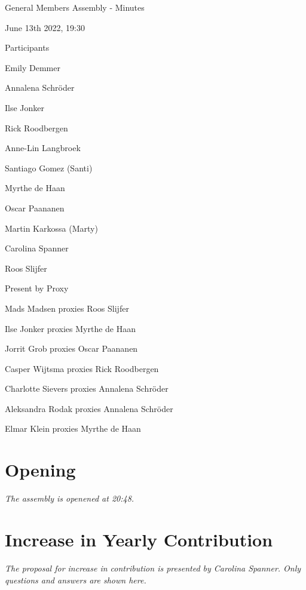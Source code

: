 \documentclass[12pt, a4paper]{article}
\begin{document}
\centering

{\huge General Members Assembly - Minutes}

{\large June 13th 2022, 19:30}

\vspace{40pt}

\raggedright

{\large Participants}

Emily Demmer

Annalena Schröder

Ilse Jonker

Rick Roodbergen

Anne-Lin Langbroek

Santiago Gomez (Santi)

Myrthe de Haan

Oscar Paananen

Martin Karkossa (Marty)

Carolina Spanner

Roos Slijfer

\vspace{\baselineskip}
{\large Present by Proxy}

Mads Madsen proxies Roos Slijfer

Ilse Jonker proxies Myrthe de Haan

Jorrit Grob proxies Oscar Paananen

Casper Wijtsma proxies Rick Roodbergen

Charlotte Sievers proxies Annalena Schröder

Aleksandra Rodak proxies Annalena Schröder

Elmar Klein proxies Myrthe de Haan

\vspace{50pt}

\tableofcontents

\pagebreak

\section{Opening}

\textit{The assembly is openened at 20:48.}

\section{Increase in Yearly Contribution}

\textit{The proposal for increase in contribution is presented by Carolina Spanner. Only questions and answers are shown here.}
\end{document}
